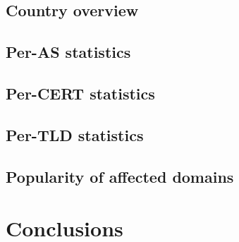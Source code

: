 \documentclass[conference]{IEEEtran}
\begin{document}
\subsection{Country overview}
\subsection{Per-AS statistics}
\subsection{Per-CERT statistics}
\subsection{Per-TLD statistics}
\subsection{Popularity of affected domains}




\section{Conclusions}


 
\end{document}
